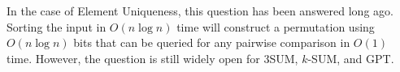 In the case of Element Uniqueness, this question has been answered long ago.
Sorting the input in \(O(n \log n)\) time will construct a permutation using
\(O(n \log n)\) bits that can be queried for any pairwise comparison in
\(O(1)\) time. However, the question is still widely open for
3SUM, \(k\)-SUM, and GPT.
